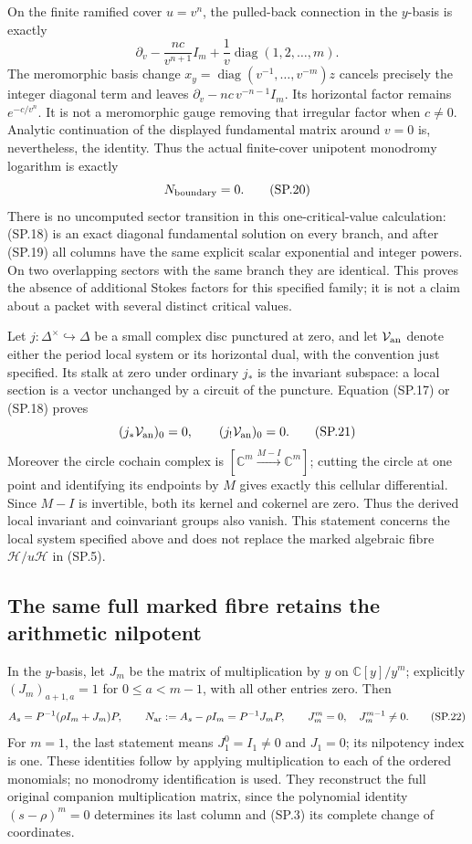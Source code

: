 On the finite ramified cover \(u=v^n\), the pulled-back
connection in the \(y\)-basis is exactly
\[
 \partial_v-\frac{nc}{v^{n+1}}I_m+
        \frac1v\operatorname{diag}(1,2,\ldots,m).
 \tag{SP.19}\label{eq:sp-coverconnection}
\]
The meromorphic basis change \(x_y=\operatorname{diag}
(v^{-1},\ldots,v^{-m})z\) cancels precisely the integer
diagonal term and leaves
\(\partial_v-nc\,v^{-n-1}I_m\).
Its horizontal factor remains \(e^{-c/v^n}\).
It is not a meromorphic gauge removing that irregular factor
when \(c\ne0\). Analytic continuation of the displayed
fundamental matrix around \(v=0\) is, nevertheless, the
identity. Thus the actual finite-cover unipotent monodromy
logarithm is exactly
\[
 N_{\rm boundary}=0 .
 \tag{SP.20}\label{eq:sp-Nboundary}
\]
There is no uncomputed sector transition in this one-critical-value
calculation: (SP.18) is an exact diagonal fundamental solution
on every branch, and after (SP.19) all columns have the same
explicit scalar exponential and integer powers. On two
overlapping sectors with the same branch they are identical.
This proves the absence of additional Stokes factors for this
specified family; it is not a claim about a packet with
several distinct critical values.

Let \(j:\Delta^\times\hookrightarrow\Delta\) be a small complex
disc punctured at zero, and let \(\mathcal V_{\rm an}\) denote
either the period local system or its horizontal dual, with the
convention just specified. Its stalk at zero under ordinary
\(j_*\) is the invariant subspace: a local section is a vector
unchanged by a circuit of the puncture. Equation (SP.17) or
(SP.18) proves
\[
 (j_*\mathcal V_{\rm an})_0=0,\qquad
 (j_!\mathcal V_{\rm an})_0=0.
 \tag{SP.21}\label{eq:sp-analyticboundary}
\]
Moreover the circle cochain complex is
\([\mathbb C^m\xrightarrow{M-I}\mathbb C^m]\);
cutting the circle at one point and identifying its endpoints
by \(M\) gives exactly this cellular differential.
Since \(M-I\) is invertible, both its kernel and cokernel
are zero. Thus the derived local invariant and coinvariant
groups also vanish. This statement concerns the local system
specified above and does not replace the marked algebraic
fibre \(\mathcal H/u\mathcal H\) in (SP.5).

\subsection{The same full marked fibre retains the arithmetic nilpotent}

In the \(y\)-basis, let \(J_m\) be the matrix of multiplication
by \(y\) on \(\mathbb C[y]/y^m\); explicitly
\((J_m)_{a+1,a}=1\) for \(0\le a<m-1\), with all other
entries zero. Then
\[
 A_s=P^{-1}(\rho I_m+J_m)P,\qquad
 N_{\rm ar}:=A_s-\rho I_m=P^{-1}J_mP,\qquad
 J_m^m=0,\quad J_m^{m-1}\ne0 .
 \tag{SP.22}\label{eq:sp-arithmetic}
\]
For \(m=1\), the last statement means \(J_1^0=I_1\ne0\)
and \(J_1=0\); its nilpotency index is one.
These identities follow by applying multiplication to each
of the ordered monomials; no monodromy identification is used.
They reconstruct the full original companion multiplication
matrix, since the polynomial identity \((s-\rho)^m=0\)
determines its last column and (SP.3) its complete change
of coordinates.

